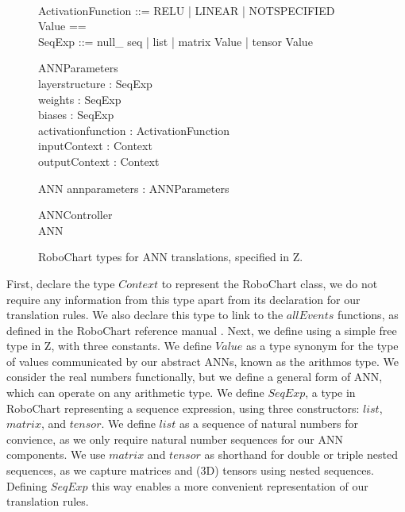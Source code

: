 \begin{figure}
    \begin{zed}
	[ Context ] \\
	ActivationFunction ::= RELU | LINEAR | NOTSPECIFIED \\
	Value == \arithmos \\
	SeqExp ::= null\_ seq | list \ldata \seq \nat \rdata | matrix \ldata \seq \seq Value \rdata | tensor \ldata \seq \seq \seq Value \rdata
\end{zed}

\begin{schema}{ANNParameters}
\\
 layerstructure : SeqExp \\
 weights : SeqExp \\
 biases : SeqExp \\
 activationfunction : ActivationFunction \\
 inputContext : Context \\
 outputContext : Context \\
\end{schema}

\begin{schema}{ANN} 
   annparameters : ANNParameters
\end{schema} 

\begin{schema}{ANNController}
\\
ANN
\end{schema}
    \caption{RoboChart types for ANN translations, specified in Z.} 
    \label{fig:robochart-ann-types}
\end{figure}

First, declare the type $Context$ to represent the RoboChart  class, we do not require any information from this type apart from its declaration for our translation rules. We also declare this type to link to the $allEvents$ functions, as defined in the RoboChart reference manual \cite{RoboChart}. Next, we define  using a simple free type in Z, with three constants. We define $Value$ as a type synonym for the type of values communicated by our abstract ANNs, known as the arithmos type. We consider the real numbers functionally, but we define a general form of ANN, which can operate on any arithmetic type. We define $SeqExp$, a type in RoboChart representing a sequence expression, using three constructors: $list$, $matrix$, and $tensor$. We define $list$ as a sequence of natural numbers for convience, as we only require natural number sequences for our ANN components. We use $matrix$ and $tensor$ as shorthand for double or triple nested sequences, as we capture matrices and (3D) tensors using nested sequences. Defining $SeqExp$ this way enables a more convenient representation of our translation rules. 

